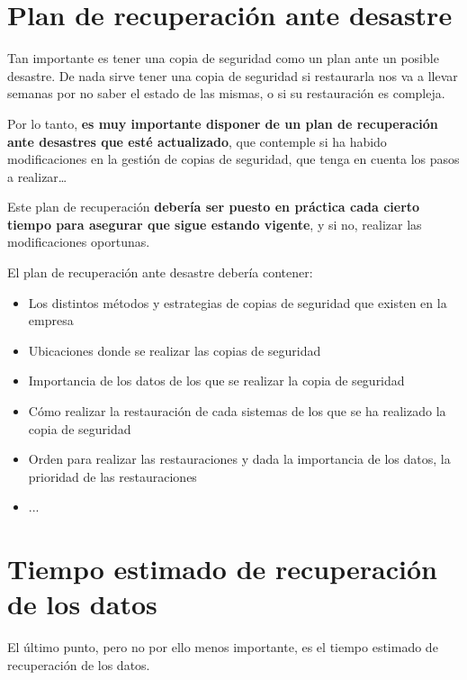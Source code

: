 \section{Plan de recuperación ante desastre}
Tan importante es tener una copia de seguridad como un plan ante un posible desastre. De nada sirve tener una copia de seguridad si restaurarla nos va a llevar semanas por no saber el estado de las mismas, o si su restauración es compleja.

Por lo tanto, \textbf{es muy importante disponer de un plan de recuperación ante desastres que esté actualizado}, que contemple si ha habido modificaciones en la gestión de copias de seguridad, que tenga en cuenta los pasos a realizar…

Este plan de recuperación \textbf{debería ser puesto en práctica cada cierto tiempo para asegurar que sigue estando vigente}, y si no, realizar las modificaciones oportunas.


El plan de recuperación ante desastre debería contener:
\begin{itemize}
    \item Los distintos métodos y estrategias de copias de seguridad que existen en la empresa
    \item Ubicaciones donde se realizar las copias de seguridad
    \item Importancia de los datos de los que se realizar la copia de seguridad
    \item Cómo realizar la restauración de cada sistemas de los que se ha realizado la copia de seguridad
    \item Orden para realizar las restauraciones y dada la importancia de los datos, la prioridad de las restauraciones
    \item ...
\end{itemize}


\section{Tiempo estimado de recuperación de los datos}
El último punto, pero no por ello menos importante, es el tiempo estimado de recuperación de los datos.

